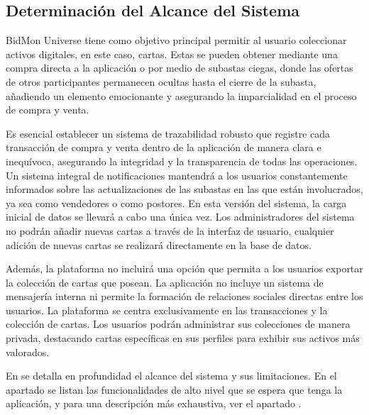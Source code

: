 \subsection{Determinación del Alcance del Sistema}
BidMon Universe tiene como objetivo principal permitir al usuario coleccionar activos digitales, en este caso, cartas. Estas se pueden obtener mediante una compra directa a la aplicación o 
por medio de subastas ciegas, donde las ofertas de otros participantes permanecen ocultas hasta el cierre de la subasta, añadiendo un elemento emocionante 
y asegurando la imparcialidad en el proceso de compra y venta. 

Es esencial establecer un sistema de trazabilidad robusto que registre cada transacción de compra y venta dentro de la aplicación de manera clara e inequívoca, asegurando la integridad y 
la transparencia de todas las operaciones. Un sistema integral de notificaciones mantendrá a los usuarios constantemente informados sobre las actualizaciones de las subastas en las que están involucrados, 
ya sea como vendedores o como postores.
En esta versión del sistema, la carga inicial de datos se llevará a cabo una única vez. Los administradores del sistema no podrán añadir nuevas cartas a través de la interfaz de usuario, 
cualquier adición de nuevas cartas se realizará directamente en la base de datos. 

Además, la plataforma no incluirá una opción que permita a los usuarios exportar la colección de cartas que posean.
La aplicación no incluye un sistema de mensajería interna ni permite la formación de relaciones sociales directas entre los usuarios. 
La plataforma se centra exclusivamente en las transacciones y la colección de cartas. Los usuarios podrán administrar sus colecciones de manera privada, 
destacando cartas específicas en sus perfiles para exhibir sus activos más valorados.

En  se detalla en profundidad el alcance del sistema y sus limitaciones.
En el apartado  se listan las 
funcionalidades de alto nivel que se espera que tenga la aplicación, y para una descripción más exhaustiva, 
ver el apartado .


